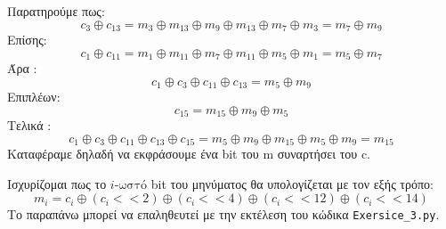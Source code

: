 \documentclass[12pt]{article}
\begin{document}
Παρατηρούμε πως:
\[
c_3 \oplus c_{13} = m_3 \oplus m_{13} \oplus m_9 \oplus m_{13} \oplus m_7 \oplus m_3 = m_7 \oplus m_{9}
\]
Επίσης:
\[
c_1 \oplus c_{11} = m_1 \oplus m_{11} \oplus m_7 \oplus m_{11} \oplus m_5 \oplus m_1 = m_5 \oplus m_7 
\]
Άρα :
\[
c_1 \oplus c_3 \oplus c_{11} \oplus c_{13} = m_5 \oplus m_9
\]
Επιπλέων:
\[
c_{15} = m_{15} \oplus m_9 \oplus m_5
\]
Τελικά :
\[
c_1 \oplus c_3 \oplus c_{11} \oplus c_{13} \oplus c_{15} = m_5 \oplus m_9 \oplus m_{15} \oplus m_5 \oplus m_9 = m_{15}
\]
Καταφέραμε δηλαδή να εκφράσουμε ένα bit του m συναρτήσει του c.

Ισχυρίζομαι πως το \( i  \text{-ωστό} \) bit του μηνύματος θα  υπολογίζεται με τον εξής τρόπο:
\[
m_i = c_i \oplus (c_i << 2) \oplus (c_i << 4) \oplus (c_i << 12) \oplus (c_i << 14) 
\]
Το παραπάνω μπορεί να επαληθευτεί με την εκτέλεση του κώδικα \texttt{Exersice\_3.py}.
\hfill \blacksquare
\end{document}
